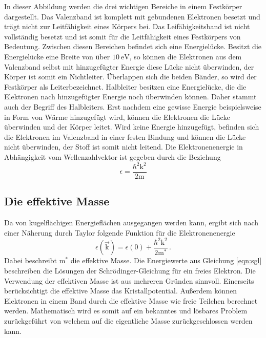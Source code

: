 In dieser Abbildung werden die drei wichtigen Bereiche in einem Festkörper
dargestellt. Das Valenzband ist komplett mit gebundenen
Elektronen besetzt und trägt nicht
zur Leitfähigkeit eines Körpers bei. Das Leifähigkeitsband ist nicht
vollständig besetzt und ist somit für die Leitfähigkeit eines Festkörpers von
Bedeutung. Zwischen diesen Bereichen befindet sich eine Energielücke. Besitzt
die Energielücke eine Breite von über $\SI{10}{\electronvolt}$, so können die
Elektronen aus dem Valenzband selbst mit hinzugefügter Energie diese Lücke nicht
überwinden, der Körper ist somit ein Nichtleiter. Überlappen sich die beiden
Bänder, so wird der Festkörper als Leiterbezeichnet. Halbleiter besitzen eine
Energielücke, die die Elektronen nach hinzugefügter Energie noch überwinden
können. Daher stammt auch der Begriff des Halbleiters. Erst nachdem eine
gewisse Energie beispielsweise in Form von Wärme hinzugefügt wird, können die
Elektronen die Lücke überwinden und der Körper leitet. Wird keine Energie
hinzugefügt, befinden sich die Elektronen im Valenzband in einer festen Bindung
und können die Lücke nicht überwinden, der Stoff ist somit nicht leitend. Die
Elektronenenergie in Abhängigkeit vom Wellenzahlvektor ist gegeben durch die
Beziehung
\begin{equation}
  \epsilon = \frac{\hbar^2 \text{k}^2}{2 \text{m}}
\end{equation}

\subsection{Die effektive Masse}
Da von kugelflächigen Energieflächen ausgegangen werden kann, ergibt sich nach
einer Näherung durch Taylor folgende Funktion für die Elektronenenergie
\begin{equation}
  \epsilon\left(\vec{\text{k}}\right) = \epsilon(0) + \frac{\hbar^2 \text{k}^2}
  {2 \text{m}^*} \, .
  \label{eqn:sgl}
\end{equation}
Dabei beschreibt $\text{m}^*$ die effektive Masse. Die Energiewerte aus
Gleichung \eqref{eqn:sgl} beschreiben die Lösungen der Schrödinger-Gleichung
für ein freies Elektron. Die Verwendung der effektiven Masse ist aus mehreren
Gründen sinnvoll. Einerseits berücksichtigt die effektive Masse das
Kristallpotential. Außerdem können Elektronen in einem Band durch die effektive
Masse wie freie Teilchen berechnet werden. Mathematisch wird es somit auf ein
bekanntes und lösbares Problem zurückgeführt von welchem auf die eigentliche
Masse zurückgeschlossen werden kann.

